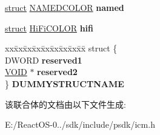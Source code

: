 \begin{DoxyCompactItemize}
\item 
\mbox{\label{uniontag_c_o_l_o_r_a522df91ebbeaf6afcf16efadfa7638a4}} 
\hyperlink{interfacestruct}{struct} \hyperlink{struct_n_a_m_e_d_c_o_l_o_r}{N\+A\+M\+E\+D\+C\+O\+L\+OR} {\bfseries named}
\item 
\mbox{\label{uniontag_c_o_l_o_r_ad22b6b9fe0d39febc222800fead0cedd}} 
\hyperlink{interfacestruct}{struct} \hyperlink{struct_hi_fi_c_o_l_o_r}{Hi\+Fi\+C\+O\+L\+OR} {\bfseries hifi}
\item 
\mbox{\label{uniontag_c_o_l_o_r_aa94b7685abc9743e8ad12bd3934f1d15}} 
\begin{tabbing}
xx\=xx\=xx\=xx\=xx\=xx\=xx\=xx\=xx\=\kill
struct \{\\
\>DWORD {\bfseries reserved1}\\
\>\hyperlink{interfacevoid}{VOID} $\ast$ {\bfseries reserved2}\\
\} {\bfseries DUMMYSTRUCTNAME}\\

\end{tabbing}\end{DoxyCompactItemize}


该联合体的文档由以下文件生成\+:\begin{DoxyCompactItemize}
\item 
E\+:/\+React\+O\+S-\/0../sdk/include/psdk/icm.\+h\end{DoxyCompactItemize}
